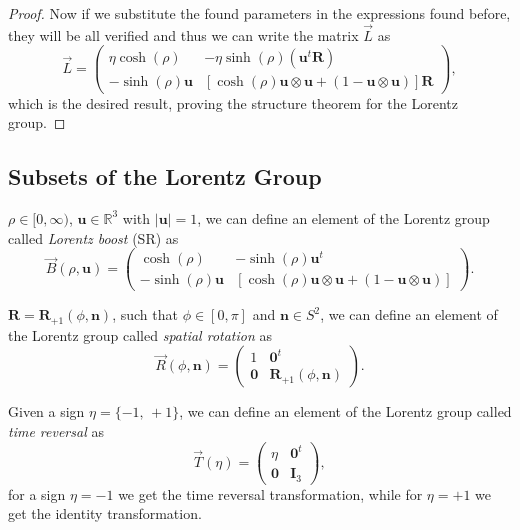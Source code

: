 \begin{proof}
    Now if we substitute the found parameters in the expressions found before, they will be all verified and thus we can write the matrix \(\vec{L}\) as
    \[
        \vec{L} = \begin{pmatrix}
            \eta \cosh(\rho)         & - \eta \sinh(\rho) (\mathbf{u}^t \mathbf{R})                                                              \\
            - \sinh(\rho) \mathbf{u} & \left[ \cosh(\rho) \mathbf{u} \otimes \mathbf{u} + (1 - \mathbf{u} \otimes \mathbf{u}) \right] \mathbf{R}
        \end{pmatrix},
    \]
    which is the desired result, proving the structure theorem for the Lorentz group.
\end{proof}

\subsection{Subsets of the Lorentz Group}

\begin{definition}
    \(\rho \in [0, \infty)\), \(\mathbf{u} \in \mathbb{R}^3\) with \(\vert \mathbf{u} \vert = 1\), we can define an element of the Lorentz group called \textit{Lorentz boost} (SR) as
    \[
        \vec{B}(\rho, \mathbf{u}) = \begin{pmatrix}
            \cosh(\rho)              & - \sinh(\rho) \mathbf{u}^t                                                                     \\
            - \sinh(\rho) \mathbf{u} & \left[ \cosh(\rho) \mathbf{u} \otimes \mathbf{u} + (1 - \mathbf{u} \otimes \mathbf{u}) \right]
        \end{pmatrix}.
    \]
\end{definition}

\begin{definition}
    \(\mathbf{R} = \mathbf{R}_{+1}(\phi,\mathbf{n})\), such that \(\phi \in [0, \pi]\) and \(\mathbf{n} \in S^2\), we can define an element of the Lorentz group called \textit{spatial rotation} as
    \[
        \vec{R}(\phi, \mathbf{n}) = \begin{pmatrix}
            1          & \mathbf{0}^t                      \\
            \mathbf{0} & \mathbf{R}_{+1}(\phi, \mathbf{n})
        \end{pmatrix}.
    \]
\end{definition}

\begin{definition}
    Given a sign \(\eta = \{-1,\,+1\}\), we can define an element of the Lorentz group called \textit{time reversal} as
    \[
        \vec{T}(\eta) = \begin{pmatrix}
            \eta       & \mathbf{0}^t \\
            \mathbf{0} & \mathbf{I}_3
        \end{pmatrix},
    \]
    for a sign \(\eta = -1\) we get the time reversal transformation, while for \(\eta = +1\) we get the identity transformation.
\end{definition}

